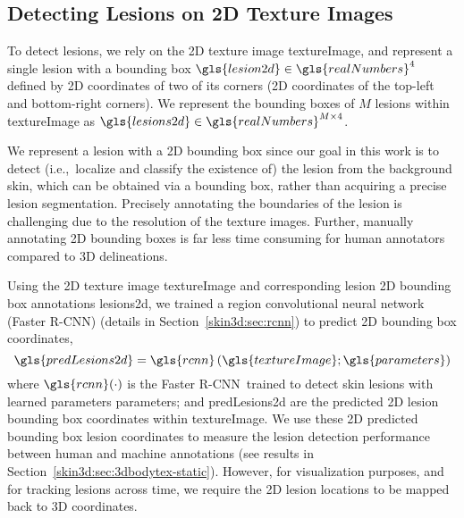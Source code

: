 \documentclass[journal]{IEEEtran}
\def\ie{i.e.,~}
\def\fasterrcnn{Faster R-CNN}
\begin{document}
\begin{center}
\captionsetup{type=table}
\vspace{-2em}
\printglossaries
\label{tab:glossary}
\end{center}


\subsection{Detecting Lesions on 2D Texture Images}
\label{skin3d:sec:detectLesion}

To detect lesions, we rely on the 2D texture image \gls{textureImage}, and represent a single lesion with a bounding box $\gls{lesion2d} \in \gls{realNumbers}^4$ defined by 2D coordinates of two of its corners (2D coordinates of the top-left and bottom-right corners). We represent the bounding boxes of $M$ lesions within \gls{textureImage} as $\gls{lesions2d} \in \gls{realNumbers}^{M \times 4}$.


We represent a lesion with a 2D bounding box since our goal in this work is to detect (\ie localize and classify the existence of) the lesion from the background skin, which can be obtained via a bounding box, rather than acquiring a precise lesion segmentation. Precisely annotating the boundaries of the lesion is challenging due to the resolution of the texture images. Further, manually annotating 2D bounding boxes is far less time consuming for human annotators compared to 3D delineations.

Using the 2D texture image \gls{textureImage} and corresponding lesion 2D bounding box annotations \gls{lesions2d}, we trained a region convolutional neural network (\fasterrcnn) (details in Section~\ref{skin3d:sec:rcnn}) to predict 2D bounding box coordinates,
\begin{equation}
    \gls{predLesions2d} = \gls{rcnn} \left( \gls{textureImage}; \gls{parameters} \right)
    \label{skin3d:eqn:lesionDetector}
\end{equation}
where $\gls{rcnn}(\cdot)$ is the \fasterrcnn~trained to detect skin lesions with learned parameters \gls{parameters}; and \gls{predLesions2d} are the predicted 2D lesion bounding box coordinates within \gls{textureImage}. We use these 2D predicted bounding box lesion coordinates to measure the lesion detection performance between human and machine annotations (see results in Section~\ref{skin3d:sec:3dbodytex-static}). However, for visualization purposes, and for tracking lesions across time, we require the 2D lesion locations to be mapped back to 3D coordinates.
\end{document}
